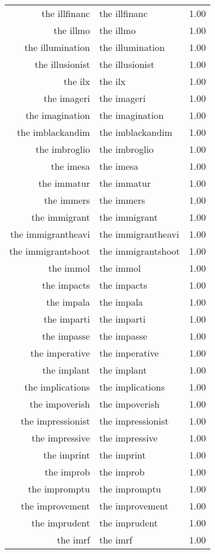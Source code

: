 \begin{table}[ht]
\begin{tabular}{rlr}
  the illfinanc & the illfinanc & 1.00 \\ 
  the illmo & the illmo & 1.00 \\ 
  the illumination & the illumination & 1.00 \\ 
  the illusionist & the illusionist & 1.00 \\ 
  the ilx & the ilx & 1.00 \\ 
  the imageri & the imageri & 1.00 \\ 
  the imagination & the imagination & 1.00 \\ 
  the imblackandim & the imblackandim & 1.00 \\ 
  the imbroglio & the imbroglio & 1.00 \\ 
  the imesa & the imesa & 1.00 \\ 
  the immatur & the immatur & 1.00 \\ 
  the immers & the immers & 1.00 \\ 
  the immigrant & the immigrant & 1.00 \\ 
  the immigrantheavi & the immigrantheavi & 1.00 \\ 
  the immigrantshoot & the immigrantshoot & 1.00 \\ 
  the immol & the immol & 1.00 \\ 
  the impacts & the impacts & 1.00 \\ 
  the impala & the impala & 1.00 \\ 
  the imparti & the imparti & 1.00 \\ 
  the impasse & the impasse & 1.00 \\ 
  the imperative & the imperative & 1.00 \\ 
  the implant & the implant & 1.00 \\ 
  the implications & the implications & 1.00 \\ 
  the impoverish & the impoverish & 1.00 \\ 
  the impressionist & the impressionist & 1.00 \\ 
  the impressive & the impressive & 1.00 \\ 
  the imprint & the imprint & 1.00 \\ 
  the improb & the improb & 1.00 \\ 
  the impromptu & the impromptu & 1.00 \\ 
  the improvement & the improvement & 1.00 \\ 
  the imprudent & the imprudent & 1.00 \\ 
  the imrf & the imrf & 1.00 \\ 

\end{tabular}
\end{table}
